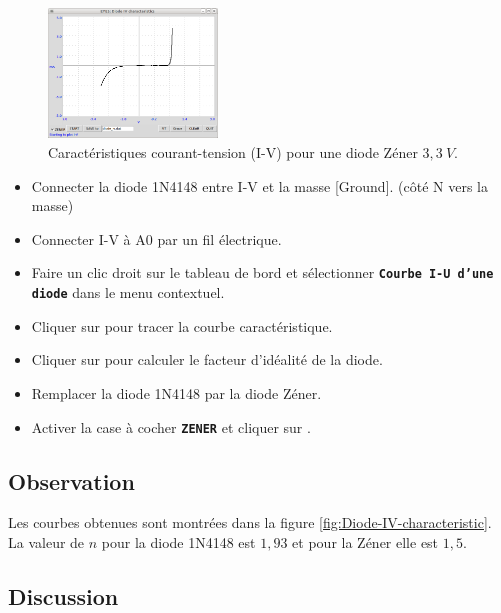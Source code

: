 \documentclass{book}
\newcommand{\nop}{}
\begin{document}
\begin{figure}[h!]
\begin{center}
\caption{\label{fig:Diode-IV-characteristic2}Caractéristiques courant-tension (I-V) pour une diode Zéner $3,3\ V$. }\vspace{0.5em}
\includegraphics[width=0.4\textwidth, height=0.3\textwidth, keepaspectratio]{Pic-diode-zener-iv.png}
\end{center}
\end{figure}



\begin{itemize}
  \item Connecter la diode 1N4148 entre I-V et la masse [Ground]. (côté N vers la masse)
  \item Connecter I-V à A0 par un fil électrique.
  \item Faire un clic droit sur le tableau de bord et sélectionner  \texttt{\textbf{Courbe I-U d'une diode}\nop} dans le menu contextuel.
  \item Cliquer sur   pour tracer la courbe caractéristique.
  \item Cliquer sur   pour calculer le facteur d'idéalité de la diode.
  \item Remplacer la diode 1N4148 par la diode Zéner.
  \item Activer la case à cocher  \texttt{\textbf{ZENER}\nop} et cliquer sur  .
\end{itemize}

\subsection{Observation}


Les courbes obtenues sont montrées dans la figure  \ref{fig:Diode-IV-characteristic}. La valeur de $n$ pour la diode 1N4148 est $1,93$ et pour la Zéner elle est $1,5$.

\subsection{Discussion}
\end{document}
